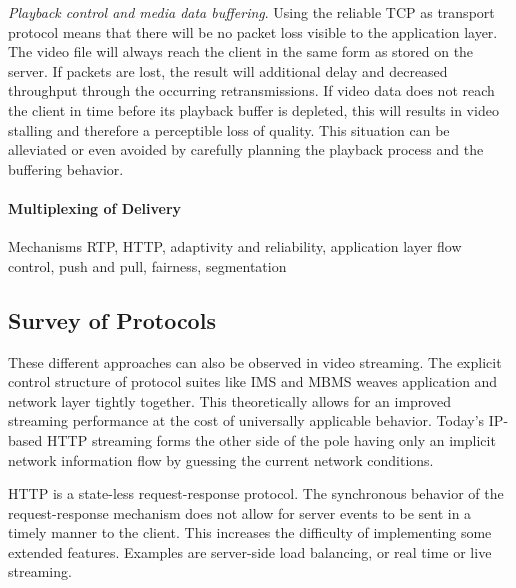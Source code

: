 \textit{Playback control and media data buffering}. Using the reliable \gls{TCP} as transport protocol means that there will be no packet loss visible to the application layer. The video file will always reach the client in the same form as stored on the server. If packets are lost, the result will additional delay and decreased throughput through the occurring retransmissions. If video data does not reach the client in time before its playback buffer is depleted, this will results in video stalling and therefore a perceptible loss of quality. This situation can be alleviated or even avoided by carefully planning the playback process and the buffering behavior.



\paragraph{Multiplexing of Delivery} %





Mechanisms RTP, HTTP, adaptivity and reliability, application layer flow control, push and pull, fairness, segmentation





\subsection{Survey of Protocols}

These different approaches can also be observed in video streaming. The explicit control structure of protocol suites like \gls{IMS}\cite{3gpp.23.228} and \gls{MBMS} weaves application and network layer tightly together. This theoretically allows for an improved streaming performance at the cost of universally applicable behavior. Today's IP-based \gls{HTTP} streaming forms the other side of the pole having only an implicit network information flow by guessing the current network conditions.

\gls{HTTP} is a state-less request-response protocol. The synchronous behavior of the request-response mechanism does not allow for server events to be sent in a timely manner to the client. This increases the difficulty of implementing some extended features. Examples are server-side load balancing, or real time or live streaming. 

